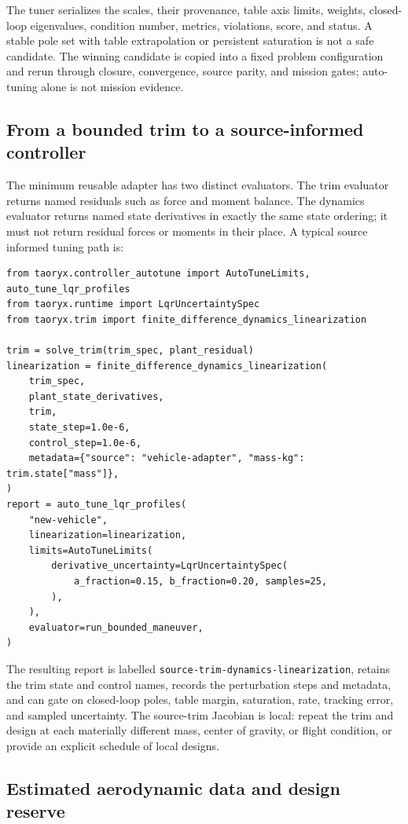 \documentclass[11pt]{article}
\begin{document}
The tuner serializes the scales, their provenance, table axis limits, weights,
closed-loop eigenvalues, condition number, metrics, violations, score, and
status. A stable pole set with table extrapolation or persistent saturation is
not a safe candidate. The winning candidate is copied into a fixed problem
configuration and rerun through closure, convergence, source parity, and
mission gates; auto-tuning alone is not mission evidence.

\subsection{From a bounded trim to a source-informed controller}

The minimum reusable adapter has two distinct evaluators. The trim evaluator
returns named residuals such as force and moment balance. The dynamics
evaluator returns named state derivatives in exactly the same state ordering;
it must not return residual forces or moments in their place. A typical source
informed tuning path is:

\begin{lstlisting}
from taoryx.controller_autotune import AutoTuneLimits, auto_tune_lqr_profiles
from taoryx.runtime import LqrUncertaintySpec
from taoryx.trim import finite_difference_dynamics_linearization

trim = solve_trim(trim_spec, plant_residual)
linearization = finite_difference_dynamics_linearization(
    trim_spec,
    plant_state_derivatives,
    trim,
    state_step=1.0e-6,
    control_step=1.0e-6,
    metadata={"source": "vehicle-adapter", "mass-kg": trim.state["mass"]},
)
report = auto_tune_lqr_profiles(
    "new-vehicle",
    linearization=linearization,
    limits=AutoTuneLimits(
        derivative_uncertainty=LqrUncertaintySpec(
            a_fraction=0.15, b_fraction=0.20, samples=25,
        ),
    ),
    evaluator=run_bounded_maneuver,
)
\end{lstlisting}

The resulting report is labelled
\texttt{source-trim-dynamics-linearization}, retains the trim state and
control names, records the perturbation steps and metadata, and can gate on
closed-loop poles, table margin, saturation, rate, tracking error, and sampled
uncertainty. The source-trim Jacobian is local: repeat the trim and design at
each materially different mass, center of gravity, or flight condition, or
provide an explicit schedule of local designs.

\subsection{Estimated aerodynamic data and design reserve}
\end{document}
